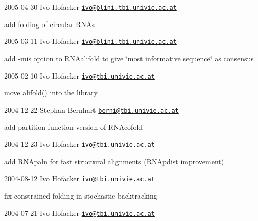 2005-\/04-\/30 Ivo Hofacker \href{mailto:ivo@blini.tbi.univie.ac.at}{\tt ivo@blini.\+tbi.\+univie.\+ac.\+at}


\begin{DoxyItemize}
\item add folding of circular R\+N\+As
\end{DoxyItemize}

2005-\/03-\/11 Ivo Hofacker \href{mailto:ivo@blini.tbi.univie.ac.at}{\tt ivo@blini.\+tbi.\+univie.\+ac.\+at}


\begin{DoxyItemize}
\item add -\/mis option to R\+N\+Aalifold to give \char`\"{}most informative
	  sequence\char`\"{} as consensus
\end{DoxyItemize}

2005-\/02-\/10 Ivo Hofacker \href{mailto:ivo@tbi.univie.ac.at}{\tt ivo@tbi.\+univie.\+ac.\+at}


\begin{DoxyItemize}
\item move \hyperlink{group__consensus__mfe__fold_ga4cf00f0659e5f0480335d69e797f05b1}{alifold()} into the library
\end{DoxyItemize}

2004-\/12-\/22 Stephan Bernhart \href{mailto:berni@tbi.univie.ac.at}{\tt berni@tbi.\+univie.\+ac.\+at}


\begin{DoxyItemize}
\item add partition function version of R\+N\+Acofold
\end{DoxyItemize}

2004-\/12-\/23 Ivo Hofacker \href{mailto:ivo@tbi.univie.ac.at}{\tt ivo@tbi.\+univie.\+ac.\+at}


\begin{DoxyItemize}
\item add R\+N\+Apaln for fast structural alignments (R\+N\+Apdist improvement)
\end{DoxyItemize}

2004-\/08-\/12 Ivo Hofacker \href{mailto:ivo@tbi.univie.ac.at}{\tt ivo@tbi.\+univie.\+ac.\+at}


\begin{DoxyItemize}
\item fix constrained folding in stochastic backtracking
\end{DoxyItemize}

2004-\/07-\/21 Ivo Hofacker \href{mailto:ivo@tbi.univie.ac.at}{\tt ivo@tbi.\+univie.\+ac.\+at}


